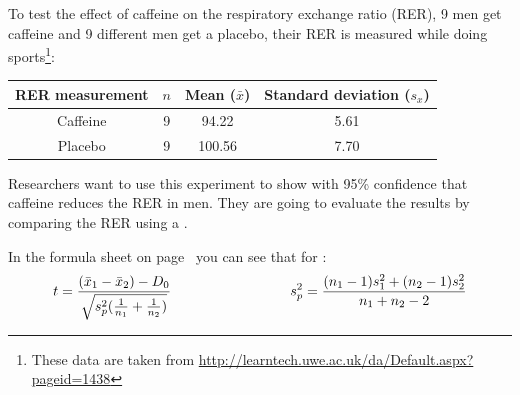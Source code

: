 \setcounter{section}{5}
\setcounter{subsection}{3}
\setcounter{question}{0}



To test the effect of caffeine on the respiratory exchange ratio (RER), 9 men get caffeine and 9 different men get a placebo, their RER is measured while doing sports\footnote{These data are taken from \url{http://learntech.uwe.ac.uk/da/Default.aspx?pageid=1438}}: \\
\vspace*{0.5cm}
\begin{center}
\begin{tabular}{c|ccc}
RER measurement & $n$ & Mean ($\bar{x}$) & Standard deviation ($s_x$) \tstrut\bstrut\\
\hline
Caffeine & 9 & 94.22 & 5.61 \tstrut\bstrut\\
Placebo & 9 & 100.56 & 7.70 \tstrut\bstrut\\
\end{tabular}
\end{center}
\vspace*{0.5cm}

Researchers want to use this experiment to show with 95\% confidence that caffeine reduces the RER in men. They are going to evaluate the results by comparing the  RER using a . \\


\twolineanswerbox


\hypothesesbox

In the formula sheet on page~\pageref{formulasheet} you can see that for :
\vspace*{0.5cm}
\begin{equation*}
    t = \frac{(\bar{x}_1 - \bar{x}_2) - D_0}{\sqrt{s^2_p (\frac{1}{n_1} + \frac{1}{n_2})}}
    \hspace*{3cm}
    s^2_p = \frac{(n_1 - 1) s^2_1 + (n_2 - 1) s^2_2}{n_1 + n_2 - 2}
\end{equation*}
\vspace*{0.5cm}

